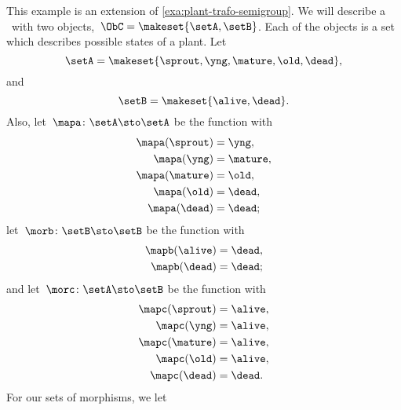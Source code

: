 \begin{example}
    \label{exa:semicat-plant-states}
    This example is an extension of \cref{exa:plant-trafo-semigroup}.
    We will describe a ~\CatC with two objects,~$\ObC = \makeset{ \setA, \setB }$.
    Each of the objects is a set which describes possible states of a plant.
    Let
    \begin{equation}
        \setA = \makeset{ \sprout, \yng, \mature, \old, \dead },
    \end{equation}
    and
    \begin{equation}
        \setB = \makeset{ \alive, \dead }.
    \end{equation}
    Also, let~$\mapa \colon \setA \sto \setA$ be the function with
    \begin{equation}
        \begin{aligned}
            \mapa(\sprout) & = \yng, \\
            \mapa(\yng)    & = \mature, \\
            \mapa(\mature) & = \old, \\
            \mapa( \old)   & = \dead, \\
            \mapa(\dead)   & = \dead;
        \end{aligned}
    \end{equation}
    let~$\morb \colon \setB \sto \setB$ be the function with
    \begin{equation}
        \begin{aligned}
            \mapb(\alive) & = \dead, \\
            \mapb(\dead)  & = \dead;
        \end{aligned}
    \end{equation}
    and let~$\morc \colon \setA \sto \setB$ be the function with
    \begin{equation}
        \begin{aligned}
            \mapc(\sprout) & = \alive, \\
            \mapc(\yng)    & = \alive, \\
            \mapc(\mature) & = \alive, \\
            \mapc( \old)   & = \alive, \\
            \mapc (\dead)  & = \dead.
        \end{aligned}
    \end{equation}
    For our sets of morphisms, we let
    \begin{equation}
        \begin{aligned}

\end{aligned}
\end{equation}
\end{example}
